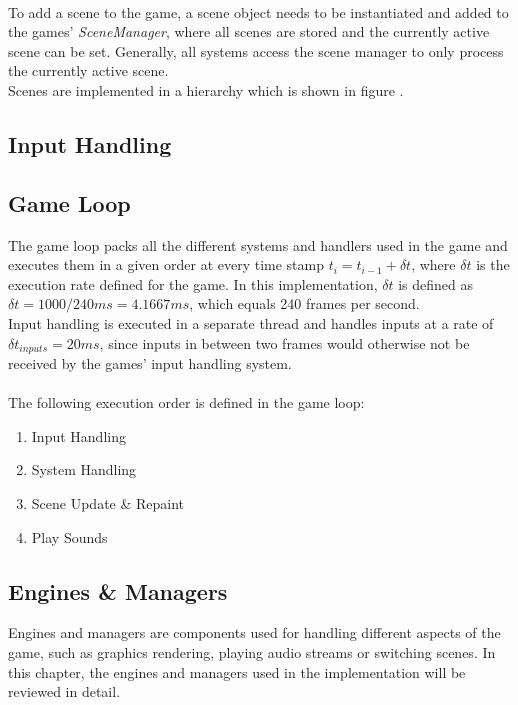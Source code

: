 \\
To add a scene to the game, a scene object needs to be instantiated and added to the games' \textit{SceneManager}, where all
scenes are stored and the currently active scene can be set.
Generally, all systems access the scene manager to only process the currently active scene.
\\

Scenes are implemented in a hierarchy which is shown in figure .
\subsection{Input Handling}\label{subsec:input-handling}

\subsection{Game Loop}\label{subsec:game-loop}
The game loop packs all the different systems and handlers used in the game and executes them in a given order at every time stamp
$t_{i} = t_{i-1} + \delta t$, where $\delta t$ is the execution rate defined for the game.
In this implementation, $\delta t$ is defined as $\delta t = 1000 / 240 ms = 4.1667 ms$, which equals 240 frames per second.
\\
Input handling is executed in a separate thread and handles inputs at a rate of $\delta t_{inputs} = 20 ms$, since inputs in between two frames
would otherwise not be received by the games' input handling system.
\\ \\
The following execution order is defined in the game loop:

\begin{enumerate}
    \item Input Handling
    \item System Handling
    \item Scene Update \& Repaint
    \item Play Sounds
\end{enumerate}

\subsection{Engines \& Managers}\label{subsec:engines}
Engines and managers are components used for handling different aspects of the game, such as graphics rendering, playing audio streams
or switching scenes.
In this chapter, the engines and managers used in the implementation will be reviewed in detail.

